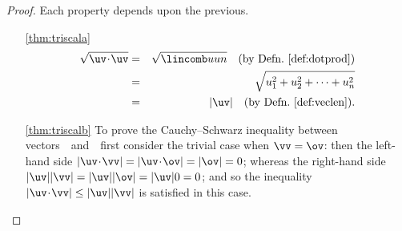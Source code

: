\begin{proof} 
Each property depends upon the previous.
\begin{itemize}
\item[\ref{thm:triscala}]
\begin{eqnarray*}
\sqrt{\uv\cdot\uv}&=&\sqrt{\lincomb uun}\quad(\text{by Defn.~\ref{def:dotprod}})
\\&=&\sqrt{u_1^2+u_2^2+\cdots+u_n^2}
\\&=&|\uv|\quad(\text{by Defn.~\ref{def:veclen}}).
\end{eqnarray*}

\item[\ref{thm:triscalb}]  
To prove the Cauchy--Schwarz inequality between vectors~\uv\ and~\vv\ first consider the trivial case when \(\vv=\ov\): then the left-hand side \(|\uv\cdot\vv|=|\uv\cdot\ov|=|\ov|=0\); whereas the right-hand side \(|\uv||\vv|=|\uv||\ov|=|\uv|0=0\); and so the inequality \(|\uv\cdot\vv|\leq|\uv||\vv|\) is satisfied in this case.


\end{itemize}
\end{proof}
